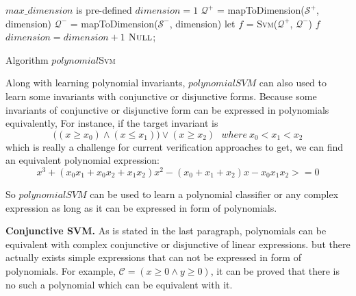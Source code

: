 \begin{algorithm}[!h]
\SetAlgoVlined
\Indm
{}
\Indp
    $max\_dimension$ is pre-defined\;
    $dimension = 1$\;
     {
        $\mathcal{Q}^+$ = mapToDimension($\mathcal{S}^+$, dimension)\;
        $\mathcal{Q}^-$ = mapToDimension($\mathcal{S}^-$, dimension)\;
        let $f$ = \textsc{Svm}($\mathcal{Q}^+$, $\mathcal{Q}^-$)\;
         {
        	\Return $f$\;
    	}
    	$dimension = dimension + 1$\;
    }
    \Return $\textsc{Null}$;
\caption{Algorithm $polynomial$\textsc{Svm}}
\label{alg:polynomialSVM}
\end{algorithm}

Along with learning polynomial invariants,
$polynomialSVM$ can also used to learn some invariants with conjunctive or disjunctive forms.
Because some invariants of conjunctive or disjunctive form can be expressed in polynomials equivalently,
For instance, if the target invariant is 
$$\big((x \ge x_0) \wedge (x \le x_1)\big) \vee (x \ge x_2) ~~~where\ x_0 < x_1 < x_2$$
which is really a challenge for current verification approaches to get,
we can find an equivalent polynomial expression:
$$x^3 + (x_0x_1 + x_0x_2 + x_1x_2)x^2 - (x_0 + x_1 + x_2)x - x_0x_1x_2 >= 0$$

So $polynomialSVM$ can be used to learn a polynomial classifier or any complex expression as long as it can be expressed in form of polynomials.

\medskip\noindent
\textbf{Conjunctive SVM.}
As is stated in the last paragraph, polynomials can be equivalent with complex conjunctive or disjunctive of linear expressions.
but there actually exists simple expressions that can not be expressed in form of polynomials.
For example, $\mathcal{C} = (x \ge 0 \wedge y \ge 0)$,
it can be proved that there is no such a polynomial which can be equivalent with it.

